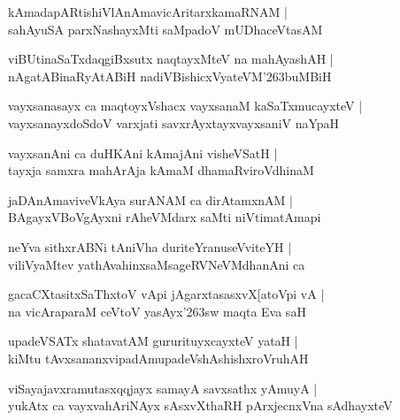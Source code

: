 \documentclass[twoside,12pt,openright]{book}
\def\S{\char'263}
\newcounter{shloka}[chapter]
\begin{document}
\begin{shloka}%
kAmadapARtishiVlAnAmavicAritarxkamaRNAM |\\
sahAyuSA parxNashayxMti saMpadoV mUDhaceVtasAM 
\end{shloka}

\begin{shloka}%
viBUtinaSaTxdaqgiBxsutx naqtayxMteV na mahAyashAH |\\
nAgatABinaRyAtABiH nadiVBishicxVyateVM\S buMBiH 
\end{shloka}

\begin{shloka}%
vayxsanasayx ca maqtoyxVshacx vayxsanaM kaSaTxmucayxteV |\\
vayxsanayxdoSdoV varxjati savxrAyxtayxvayxsaniV naYpaH
\end{shloka}

\begin{shloka}%
vayxsanAni ca duHKAni kAmajAni visheVSatH |\\
tayxja samxra mahArAja kAmaM dhamaRviroVdhinaM 
\end{shloka}

\begin{shloka}%
jaDAnAmaviveVkAya surANAM ca dirAtamxnAM |\\
BAgayxVBoVgAyxni rAheVMdarx saMti niVtimatAmapi
\end{shloka}

\begin{shloka}%
neYva sithxrABNi tAniVha duriteYranuseVviteYH |\\
viliVyaMtev yathAvahinxsaMsageRVNeVMdhanAni ca 
\end{shloka}

\begin{shloka}%
gacaCXtasitxSaThxtoV vApi jAgarxtasasxvX[atoVpi vA |\\
na vicAraparaM ceVtoV yasAyx\S sw maqta Eva saH 
\end{shloka}

\begin{shloka}%
upadeVSATx shatavatAM gururituyxcayxteV yataH |\\
kiMtu tAvxsananxvipadAmupadeVshAshishxroVruhAH
\end{shloka}

\begin{shloka}%
viSayajavxramutasxqqjayx samayA savxsathx yAmuyA |\\
yukAtx ca vayxvahAriNAyx sAsxvXthaRH  pArxjecnxVna sAdhayxteV 
\end{shloka}
\end{document}
